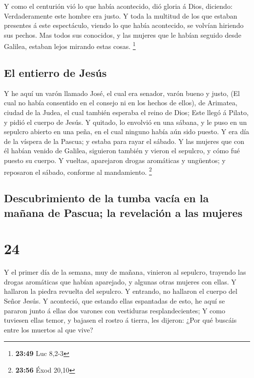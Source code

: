  Y como el centurión vió lo que había acontecido, dió
gloria á Dios, diciendo: Verdaderamente este hombre era justo.
 Y toda la multitud de los que estaban presentes á este
espectáculo, viendo lo que había acontecido, se volvían hiriendo sus
pechos.  Mas todos sus conocidos, y las mujeres que le
habían seguido desde Galilea, estaban lejos mirando estas cosas.
\footnote{\textbf{23:49} Luc 8,2-3}

\hypertarget{el-entierro-de-jesuxfas}{%
\subsection{El entierro de Jesús}\label{el-entierro-de-jesuxfas}}

 Y he aquí un varón llamado José, el cual era senador,
varón bueno y justo,  (El cual no había consentido en el
consejo ni en los hechos de ellos), de Arimatea, ciudad de la Judea, el
cual también esperaba el reino de Dios;  Este llegó á
Pilato, y pidió el cuerpo de Jesús.  Y quitado, lo
envolvió en una sábana, y le puso en un sepulcro abierto en una peña, en
el cual ninguno había aún sido puesto.  Y era día de la
víspera de la Pascua; y estaba para rayar el sábado.  Y
las mujeres que con él habían venido de Galilea, siguieron también y
vieron el sepulcro, y cómo fué puesto su cuerpo.  Y
vueltas, aparejaron drogas aromáticas y ungüentos; y reposaron el
sábado, conforme al mandamiento. \footnote{\textbf{23:56} Éxod 20,10}

\hypertarget{descubrimiento-de-la-tumba-vacuxeda-en-la-mauxf1ana-de-pascua-la-revelaciuxf3n-a-las-mujeres}{%
\subsection{Descubrimiento de la tumba vacía en la mañana de Pascua; la
revelación a las
mujeres}\label{descubrimiento-de-la-tumba-vacuxeda-en-la-mauxf1ana-de-pascua-la-revelaciuxf3n-a-las-mujeres}}

\hypertarget{section-23}{%
\section{24}\label{section-23}}

 Y el primer día de la semana, muy de mañana, vinieron al
sepulcro, trayendo las drogas aromáticas que habían aparejado, y algunas
otras mujeres con ellas.  Y hallaron la piedra revuelta
del sepulcro.  Y entrando, no hallaron el cuerpo del Señor
Jesús.  Y aconteció, que estando ellas espantadas de esto,
he aquí se pararon junto á ellas dos varones con vestiduras
resplandecientes;  Y como tuviesen ellas temor, y bajasen
el rostro á tierra, les dijeron: ¿Por qué buscáis entre los muertos al
que vive?

